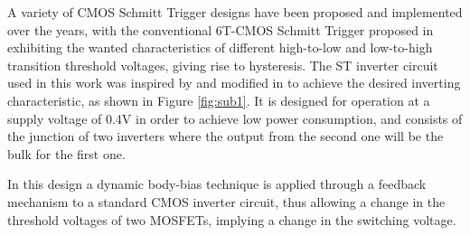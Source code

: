 \documentclass[ecp,tc, english]{iiufrgs}
\begin{document}
A variety of CMOS Schmitt Trigger designs have been proposed and implemented over the years, with the conventional 6T-CMOS Schmitt Trigger proposed in \cite{doki1984cmos} exhibiting the wanted characteristics of different high-to-low and low-to-high transition threshold voltages, giving rise to hysteresis. The ST inverter circuit used in this work was inspired by \cite{zhang2003low} and modified in \cite{dokania2015circuit} to achieve the desired inverting characteristic, as shown in Figure \ref{fig:sub1}. It is designed for operation at a supply voltage of 0.4V in order to achieve low power consumption, and consists of the junction of two inverters where the output from the second one will be the bulk for the first one.  

In this design a dynamic body-bias technique is applied through a feedback mechanism to a standard CMOS inverter circuit, thus allowing a change in the threshold voltages of two MOSFETs, implying a change in the switching voltage. 
\end{document}
